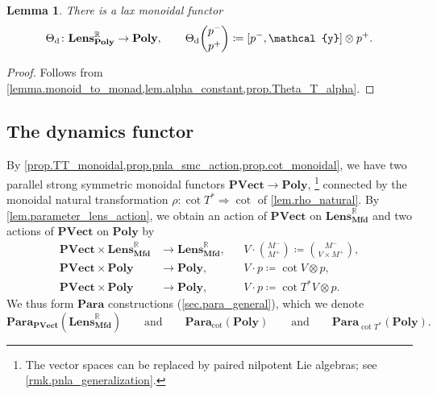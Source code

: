 \documentclass[11pt, oneside, article]{memoir}
\theoremstyle{definition}
\theoremstyle{plain}
\newtheorem{lemma}[lemma]{Lemma}
\DeclarePairedDelimiter{\ihom}{[}{]}
\newcommand{\Cat}[1]{\mathbf{#1}}%
\newcommand{\fun}[1]{\mathrm{#1}}%
\newcommand{\Fun}[1]{\mathsf{#1}}%
\newcommand{\id}{\mathrm{id}}
\newcommand{\rr}{\mathbb{R}}
\newcommand{\yon}{\mathcal{y}}
\newcommand{\poly}{\Cat{Poly}}
\newcommand{\qqand}{\qquad\text{and}\qquad}
\newcommand{\mfd}{\Cat{Mfd}}
\newcommand{\ev}{\fun{ev}}
\newcommand{\coev}{\fun{coev}}
\newcommand{\Para}{\Cat{Para}}
\newcommand{\para}[2]{\Para_{#1}(#2)}
\newcommand{\pvect}{\Cat{PVect}}
\newcommand{\Lens}[1]{\Cat{Lens}_{#1}}
\newcommand{\lmfd}{\Lens{\mfd}}
\newcommand{\inpt}[1]{#1^{-}}
\newcommand{\outp}[1]{#1^{+}}
\newcommand{\lensob}[1]{\binom{\inpt{#1}}{\outp{#1}}}%
\newcommand{\potd}{\fun{d}}
\begin{document}
\begin{lemma}\label{lem.Theta_poly_potential}
There is a lax monoidal functor
\[
\Theta_{\potd}\colon\Lens{\poly}^\rr\to\poly,\qquad
\Theta_{\potd}\lensob p\coloneqq\ihom{\inpt p,\yon}\otimes\outp p.
\]
\end{lemma}

\begin{proof}
Follows from \cref{lemma.monoid_to_monad,lem.alpha_constant,prop.Theta_T_alpha}.
\end{proof}

\subsection{The dynamics functor}\label{subsec.dynamics_functor}

By \cref{prop.TT_monoidal,prop.pnla_smc_action,prop.cot_monoidal}, we have two parallel strong symmetric monoidal functors $\pvect\to\poly$,%
\footnote{The vector spaces can be replaced by paired nilpotent Lie algebras; see \cref{rmk.pnla_generalization}.}
connected by the monoidal natural transformation $\rho\colon\cot{T^*}\Rightarrow\cot$ of \cref{lem.rho_natural}. By \cref{lem.parameter_lens_action}, we obtain an action of $\pvect$ on $\lmfd^\rr$ and two actions of $\pvect$ on $\poly$ by
\begin{align*}
\pvect\times\lmfd^\rr&\to\lmfd^\rr,&&V\cdot\lensob M\coloneqq\binom{\inpt M}{V\times\outp M},\\
\pvect\times\poly&\to\poly,&&V\cdot p\coloneqq\cot{V}\otimes p,\\
\pvect\times\poly&\to\poly,&&V\cdot p\coloneqq\cot{T^*V}\otimes p.
\end{align*}
We thus form $\Para$ constructions (\cref{sec.para_general}), which we denote
\[
\para{\pvect}{\lmfd^\rr}\qqand
\para{\cot}{\poly}\qqand
\para{\cot{T^*}}{\poly}.
\]
\end{document}
